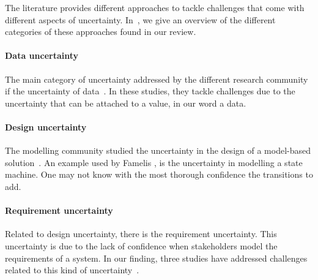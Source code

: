 The literature provides different approaches to tackle challenges that come with different aspects of uncertainty.
In~, we give an overview of the different categories of these approaches found in our review.

\paragraph{Data uncertainty}
The main category of uncertainty addressed by the different research community if the uncertainty of data~\cite{DBLP:conf/models/BurguenoBMV18, baudin2017openturns, DBLP:journals/corr/BorgstromGGMG13, DBLP:conf/ecmdafa/BertoaMBBTV18, DBLP:conf/asplos/BornholtMM14, osti_1430202, DBLP:conf/sle/MayerhoferWV16, DBLP:journals/peerj-cs/SalvatierWF16, DBLP:conf/quatic/VallecilloMO16, DBLP:journals/sosym/Zhang00NO19, DBLP:journals/csi/Hall06, DBLP:journals/infsof/Jimenez-RamirezW0V15, DBLP:conf/ecmdafa/ZhangSAYON16, DBLP:journals/tkde/BarbaraGP92, DBLP:conf/vldb/BenjellounSHW06, DBLP:conf/popl/BhatAVG12, DBLP:conf/aistats/ChagantyNR13, DBLP:journals/siamsc/JaroszewiczK12, DBLP:journals/toplas/ParkPT08, DBLP:conf/ijcai/Pfeffer01, DBLP:conf/popl/RamseyP02, DBLP:conf/pldi/SankaranarayananCG13, DBLP:conf/uist/SchwarzMH11, DBLP:conf/icra/Thrun00, DBLP:journals/sac/LunnTBS00, plummer2003jags}.
In these studies, they tackle challenges due to the uncertainty that can be attached to a value, in our word a data.

\paragraph{Design uncertainty}
The modelling community studied the uncertainty in the design of a model-based solution~\cite{DBLP:conf/icse/FamelisSC12, DBLP:journals/sosym/FamelisC19, DBLP:conf/sle/EramoPR15, DBLP:conf/icse/EramoPR14, DBLP:journals/re/SalayCHS13, DBLP:conf/ecmdafa/ZhangSAYON16}.
An example used by Famelis \etal \cite{DBLP:conf/icse/FamelisSC12}, is the uncertainty in modelling a state machine.
One may not know with the most thorough confidence the transitions to add.

\paragraph{Requirement uncertainty}
Related to design uncertainty, there is the requirement uncertainty.
This uncertainty is due to the lack of confidence when stakeholders model the requirements of a system.
In our finding, three studies have addressed challenges related to this kind of uncertainty~\cite{DBLP:journals/re/WhittleSBCB10, DBLP:conf/re/WhittleSBCB09, DBLP:journals/re/SalayCHS13}.
	
